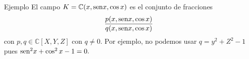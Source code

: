 \documentclass{book}
\newcommand{\sen}{{\rm sen}}
\newcommand{\Co}{\mathbb{C}}
\begin{document}

\begin{miEjemplo}{Ejemplo}
El campo $K=\Co(x, \sen x, \cos x)$ es el conjunto de fracciones
$$\frac{p(x, \sen x, \cos x)}{q(x, \sen x, \cos x)}$$
con $p, q \in \Co[X,Y,Z]$ con $q\neq 0.$ Por ejemplo, no podemos
usar $q=y^2+Z^2-1$ pues $\sen^2x+\cos^2x-1=0.$
\end{miEjemplo}
\end{document}
